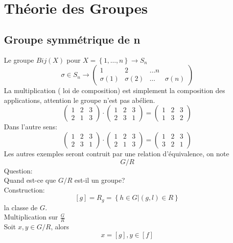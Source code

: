\documentclass[../main.tex]{subfiles}
\begin{document}

\section{Théorie des Groupes}
\subsection{Groupe symmétrique de n}
Le groupe $Bij(X)$ pour $X= \left\{ 1,\ldots,n \right\} \to S_n$
\[ 
\sigma \in S_n \to
\begin{pmatrix}
	1 & 2 &\ldots n\\
	\sigma(1) & \sigma(2) &\ldots & \sigma(n)
\end{pmatrix}
\]
La multiplication ( loi de composition) est simplement la composition des applications, attention le groupe n'est pas abélien.
\[ 
\begin{pmatrix}
	1 &2 &3\\
	2 &1 &3
\end{pmatrix}
\cdot
\begin{pmatrix}
	1 & 2 &3\\
	2 &3 &1
\end{pmatrix}
= 
\begin{pmatrix}
	1 &2 &3\\
	1 & 3 &2
\end{pmatrix}
\]
Dans l'autre sens:
\[ 
\begin{pmatrix}
	1 & 2 &3\\
	2 &3 &1
\end{pmatrix}
\cdot
\begin{pmatrix}
	1 &2 &3\\
	2 &1 &3
\end{pmatrix}
= 
\begin{pmatrix}
	1 &2 &3\\
	3 &2 &1
\end{pmatrix}
\]
Les autres exemples seront contruit par une relation d'équivalence, on note
\[ 
G / R
\]
Question:\\
Quand est-ce que $G /R$ est-il un groupe?\\
Construction:\\
\[ 
	[ g]= R_g= \left\{ h \in G | ( g,l)\in R \right\} 
\]
la classe de $G$.\\
Multiplication sur $\frac{G}{R}$ \\
Soit $x,y \in G/R$, alors
\[ 
	x = [ g] ,y \in [ f]
\]
\end{document}
